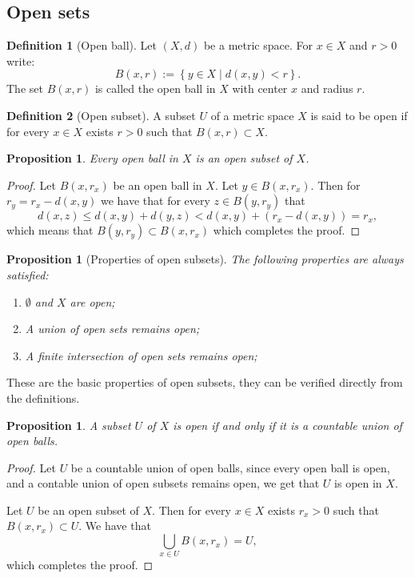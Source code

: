 \documentclass[11pt,a4paper]{article}
\theoremstyle{definition}
\newtheorem{definition}{Definition}[section]
\theoremstyle{plain}
\newtheorem{proposition}[theorem]{Proposition}
\newcommand{\set}[2]{ \left\{ #1 \mid #2 \right\} }
\begin{document}
  \subsection{Open sets}

  \begin{definition}[Open ball]
    Let $(X,d)$ be a metric space. For $x \in X$ and $r > 0$ write:
    \[
      B(x,r) := \set{y \in X}{d(x,y) < r}.
    \]
    The set $B(x,r)$ is called the open ball in $X$ with center $x$
    and radius $r$.
  \end{definition}
  
  \begin{definition}[Open subset]
    A subset $U$ of a metric space $X$ is said to be open if for every
    $x \in X$ exists $r > 0$ such that $B(x,r) \subset X$.
  \end{definition}

  \begin{proposition}
    Every open ball in $X$ is an open subset of $X$.
  \end{proposition}
  \begin{proof}
    Let $B(x,r_x)$ be an open ball in $X$. Let $y \in B(x,r_x)$. Then for
    $r_y = r_x - d(x,y)$ we have that for every $z \in B(y,r_y)$ that
    \[
      d(x,z) \le d(x,y) + d(y,z) < d(x,y) + (r_x - d(x,y)) = r_x,
    \]
    which means that $B(y,r_y) \subset B(x,r_x)$ which completes the proof.
  \end{proof}

  \begin{proposition}[Properties of open subsets]
    The following properties are always satisfied:
    \begin{enumerate}
      \item[(1)] $\emptyset$ and $X$ are open;
      \item[(2)] A union of open sets remains open;
      \item[(3)] A finite intersection of open sets remains open;
    \end{enumerate}
  \end{proposition}
  These are the basic properties of open subsets, they can be verified
  directly from the definitions.

  \begin{proposition}
    A subset $U$ of $X$ is open if and only if it is a countable union of
    open balls.
  \end{proposition}
  \begin{proof}
    Let $U$ be a countable union of open balls, since every open ball is
    open, and a contable union of open subsets remains open, we get that
    $U$ is open in $X$.

    Let $U$ be an open subset of $X$. Then for every $x \in X$ exists
    $r_x > 0$ such that $B(x,r_x) \subset U$. We have that
    \[
      \bigcup_{x \in U} B(x,r_x) = U,
    \]
    which completes the proof.
  \end{proof}
\end{document}
